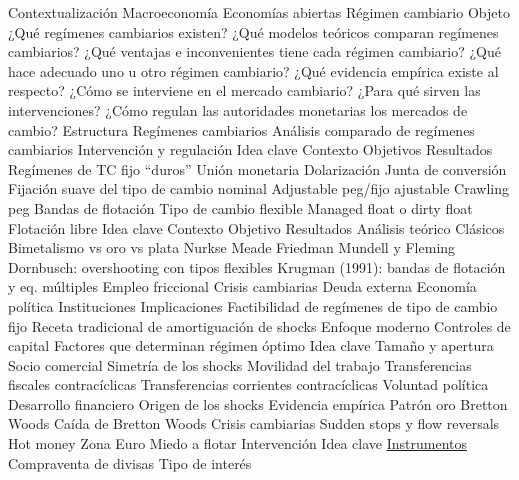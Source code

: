 \documentclass{nuevotema}
\begin{document}
\begin{esquema}[enumerate]
	\1[] 
		\2 Contextualización
			\3 Macroeconomía
			\3 Economías abiertas
			\3 Régimen cambiario
		\2 Objeto
			\3 ¿Qué regímenes cambiarios existen?
			\3 ¿Qué modelos teóricos comparan regímenes cambiarios?
			\3 ¿Qué ventajas e inconvenientes tiene cada régimen cambiario?
			\3 ¿Qué hace adecuado uno u otro régimen cambiario?
			\3 ¿Qué evidencia empírica existe al respecto?
			\3 ¿Cómo se interviene en el mercado cambiario?
			\3 ¿Para qué sirven las intervenciones?
			\3 ¿Cómo regulan las autoridades monetarias los mercados de cambio?
		\2 Estructura
			\3 Regímenes cambiarios
			\3 Análisis comparado de regímenes cambiarios
			\3 Intervención y regulación
	\1 
		\2 Idea clave
			\3 Contexto
			\3 Objetivos
			\3 Resultados
		\2 Regímenes de TC fijo ``duros''
			\3 Unión monetaria
			\3 Dolarización
			\3 Junta de conversión
		\2 Fijación suave del tipo de cambio nominal
			\3 Adjustable peg/fijo ajustable
			\3 Crawling peg
			\3 Bandas de flotación
		\2 Tipo de cambio flexible
			\3 Managed float o dirty float
			\3 Flotación libre
	\1 
		\2 Idea clave
			\3 Contexto
			\3 Objetivo
			\3 Resultados
		\2 Análisis teórico
			\3 Clásicos
			\3 Bimetalismo vs oro vs plata
			\3 Nurkse
			\3 Meade
			\3 Friedman
			\3 Mundell y Fleming
			\3 Dornbusch: overshooting con tipos flexibles
			\3 Krugman (1991): bandas de flotación y eq. múltiples
			\3 Empleo friccional
			\3 Crisis cambiarias
			\3 Deuda externa
			\3 Economía política
			\3 Instituciones
		\2 Implicaciones
			\3 Factibilidad de regímenes de tipo de cambio fijo
			\3 Receta tradicional de amortiguación de shocks
			\3 Enfoque moderno
			\3 Controles de capital
		\2 Factores que determinan régimen óptimo
			\3 Idea clave
			\3[\textsc{i}] Tamaño y apertura
			\3[\textsc{ii}] Socio comercial
			 Simetría de los shocks
			\3[\textsc{iv}] Movilidad del trabajo
			\3[\textsc{v}] Transferencias fiscales contracíclicas
			\3[\textsc{vi}] Transferencias corrientes contracíclicas
			 Voluntad política
			 Desarrollo financiero
			\3[\textsc{ix}] Origen de los shocks
		\2 Evidencia empírica
			\3 Patrón oro
			\3 Bretton Woods
			\3 Caída de Bretton Woods
			\3 Crisis cambiarias
			\3 Sudden stops y flow reversals
			\3 Hot money
			\3 Zona Euro
			\3 Miedo a flotar
	\1 
		\2 Intervención
			\3 Idea clave
			\3 \underline{Instrumentos}
			\3 Compraventa de divisas
			\3 Tipo de interés

\end{esquema}
\end{document}
